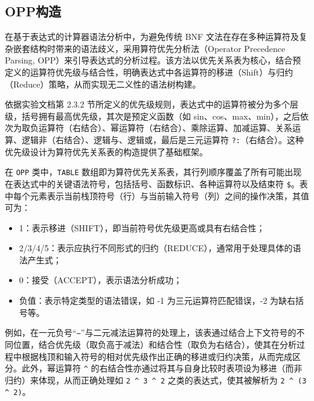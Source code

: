 \documentclass[a4paper, twoside, utf8]{ctexart}
\begin{document}
    \subsection{OPP构造}

    在基于表达式的计算器语法分析中，为避免传统 BNF 文法在存在多种运算符及复杂嵌套结构时带来的语法歧义，采用算符优先分析法（Operator Precedence Parsing, OPP）来引导表达式的分析过程。该方法以优先关系表为核心，结合预定义的运算符优先级与结合性，明确表达式中各运算符的移进（Shift）与归约（Reduce）策略，从而实现无二义性的语法树构建。

    依据实验文档第 2.3.2 节所定义的优先级规则，表达式中的运算符被分为多个层级，括号拥有最高优先级，其次是预定义函数（如 sin、cos、max、min），之后依次为取负运算符（右结合）、幂运算符（右结合）、乘除运算、加减运算、关系运算、逻辑非（右结合）、逻辑与、逻辑或，最后是三元运算符 \verb|?:|（右结合）。这种优先级设计为算符优先关系表的构造提供了基础框架。
    
    在 \verb|OPP| 类中，\verb|TABLE| 数组即为算符优先关系表，其行列顺序覆盖了所有可能出现在表达式中的关键语法符号，包括括号、函数标识、各种运算符以及结束符 \verb|$|。表中每个元素表示当前栈顶符号（行）与当前输入符号（列）之间的操作决策，其值可为：

    \begin{itemize}[itemsep=0pt, topsep=2pt, parsep=2pt]
        \item 1：表示移进（SHIFT），即当前符号优先级更高或具有右结合性；
        \item 2/3/4/5：表示应执行不同形式的归约（REDUCE），通常用于处理具体的语法产生式；
        \item 0：接受（ACCEPT），表示语法分析成功；
        \item 负值：表示特定类型的语法错误，如 -1 为三元运算符匹配错误，-2 为缺右括号等。
    \end{itemize}
    
    例如，在一元负号“\verb|−|”与二元减法运算符的处理上，该表通过结合上下文符号的不同位置，结合优先级（取负高于减法）和结合性（取负为右结合），使其在分析过程中根据栈顶和输入符号的相对优先级作出正确的移进或归约决策，从而完成区分。此外，幂运算符 \verb|^| 的右结合性亦通过将其与自身比较时表项设为移进（而非归约）来体现，从而正确处理如 \verb|2 ^ 3 ^ 2| 之类的表达式，使其被解析为 \verb|2 ^ (3 ^ 2)|。
\end{document}
